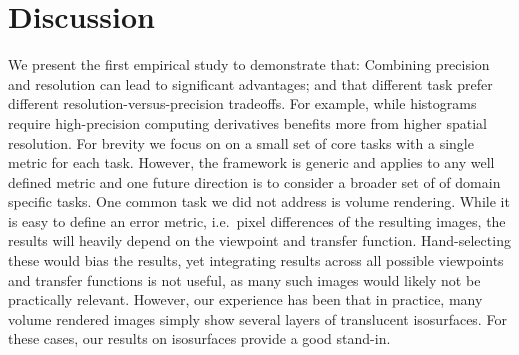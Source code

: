 \section{Discussion}

We present the first empirical study to demonstrate that: Combining precision and resolution can lead to significant advantages; and that different task prefer different resolution-versus-precision tradeoffs. 
For example, while histograms require high-precision computing derivatives benefits more from higher spatial resolution.
For brevity we focus on on a small set of core tasks with a single metric for each task. 
However, the framework is generic and applies to any well defined metric and one future direction is to consider a broader set of of domain specific tasks. 
One common task we did not address is volume rendering. 
While it is easy to define an error metric, i.e.\ pixel differences of the resulting images, the results will heavily depend on the viewpoint and transfer function.
Hand-selecting these would bias the results, yet integrating results across all possible viewpoints and transfer functions is not useful, as many such images would likely not be practically relevant. 
However, our experience has been that in practice, many volume rendered images simply show several layers of translucent isosurfaces. 
For these cases, our results on isosurfaces provide a good stand-in.


